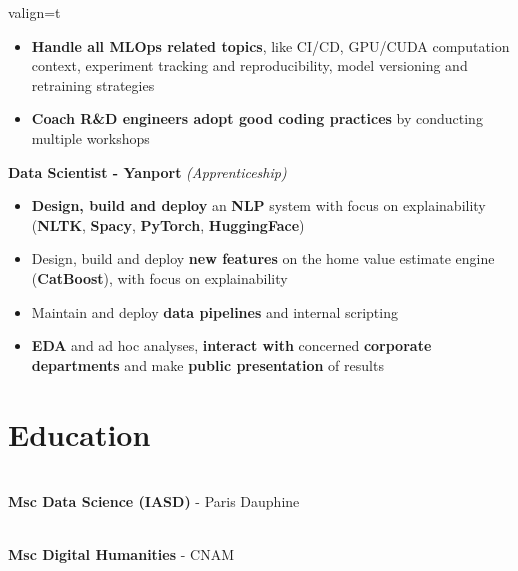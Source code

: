 \documentclass[a4paper,10pt]{article}
\begin{document}
\begin{adjustbox}{valign=t}
\begin{minipage}{0.6\textwidth}
\begin{description}
\begin{itemize}[topsep=0pt]
                    \item \textbf{Handle all MLOps related topics}, like CI/CD, GPU/CUDA computation context, experiment tracking and reproducibility, model versioning and retraining strategies
                    \item \textbf{Coach R\&D engineers adopt good coding practices} by conducting multiple workshops
                \end{itemize}
                \normalsize
            \item[\normalfont \textcolor{ColorOne}{Sep. 2021 -- Sep. 2022}]
                \textbf{Data Scientist - Yanport} \textit{(Apprenticeship)}\\
                \small
                \begin{itemize}[topsep=0pt]
                    \item \textbf{Design, build and deploy} an \textbf{NLP} system with focus on explainability (\textbf{NLTK}, \textbf{Spacy}, \textbf{PyTorch}, \textbf{HuggingFace})
                    \item Design, build and deploy \textbf{new features} on the home value estimate engine (\textbf{CatBoost}), with focus on explainability
                    \item Maintain and deploy \textbf{data pipelines} and internal scripting
                    \item \textbf{EDA} and ad hoc analyses, \textbf{interact with} concerned \textbf{corporate departments} and make \textbf{public presentation} of results
                \end{itemize}
                \normalsize
        \end{description}
        \vspace{0.5cm}
        \section*{Education}
        \vspace{-.3cm}
        \begin{description}
            \raggedright
            \item [\normalfont \textcolor{ColorOne}{2021 -- 2022}]~\\
                  \textbf{Msc Data Science (IASD)} - Paris Dauphine
            \item [\normalfont \textcolor{ColorOne}{2019 -- 2021}]~\\
                  \textbf{Msc Digital Humanities} - CNAM
        \end{description}
    \end{minipage}
\end{adjustbox}
\end{document}
